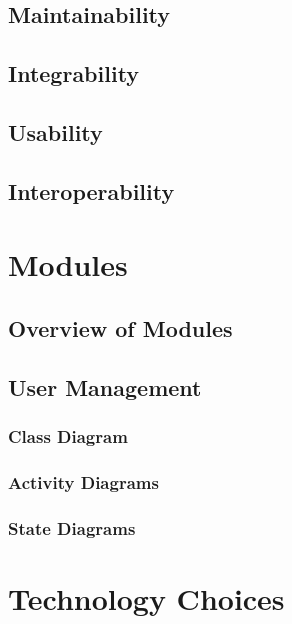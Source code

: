 \documentclass{article}
\begin{document}
	
	
	\subsection{Maintainability}
	
	
	
	\subsection{Integrability}

	
	
	
	\subsection{Usability}
	
	
	
	\subsection{Interoperability}
	
	
\pagebreak
\section{Modules}

	\subsection{Overview of Modules}
	
	
	
	\subsection{User Management}
	
	
		\subsubsection{Class Diagram}
		
		
		
		\subsubsection{Activity Diagrams}
		
		
		
		\subsubsection{State Diagrams}
	

\pagebreak
\section{Technology Choices}
\end{document}
